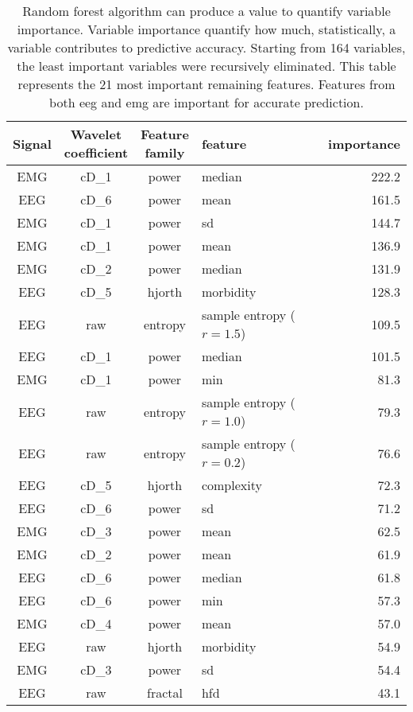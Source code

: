 \begin {table}[!h]
\begin{center}
\caption{
Random forest algorithm can produce a value to quantify variable importance.
Variable importance quantify how much, statistically, a variable contributes to predictive accuracy.
Starting from 164 variables, the least important variables were recursively eliminated.
This table represents the 21 most important remaining features.
Features from both \gls{eeg} and \gls{emg} are important for accurate prediction.
\label{tab:importances}}

\small
\begin{tabular}{|c|c|c|l|r|}
  \hline
 Signal & \specialcell{Wavelet\\coefficient} & \specialcell{Feature\\family}  & feature & importance\\
\hline
\hline
EMG & cD\_1 & power & median & 222.2\\
EEG & cD\_6 & power & mean & 161.5\\
EMG & cD\_1 & power & sd &  144.7\\
EMG & cD\_1 & power & mean & 136.9\\
EMG & cD\_2 & power & median & 131.9\\
EEG & cD\_5 & hjorth & morbidity & 128.3\\
EEG & raw & entropy & sample entropy ($r=1.5$) & 109.5\\
EEG & cD\_1 & power & median & 101.5\\
EMG & cD\_1 & power & min & 81.3\\
EEG & raw & entropy & sample entropy ($r=1.0$) & 79.3\\
EEG & raw & entropy & sample entropy ($r=0.2$) & 76.6\\
EEG & cD\_5 & hjorth & complexity & 72.3\\
EEG & cD\_6 & power & sd & 71.2\\
EMG & cD\_3 & power & mean & 62.5\\
EMG & cD\_2 & power & mean & 61.9\\
EEG & cD\_6 & power & median & 61.8\\
EEG & cD\_6 & power & min & 57.3\\
EMG & cD\_4 & power & mean & 57.0\\
EEG & raw & hjorth & morbidity & 54.9\\
EMG & cD\_3 & power & sd & 54.4\\
EEG & raw & fractal & hfd & 43.1\\
\hline
 


\end{tabular}
\end{center}
\end{table}

